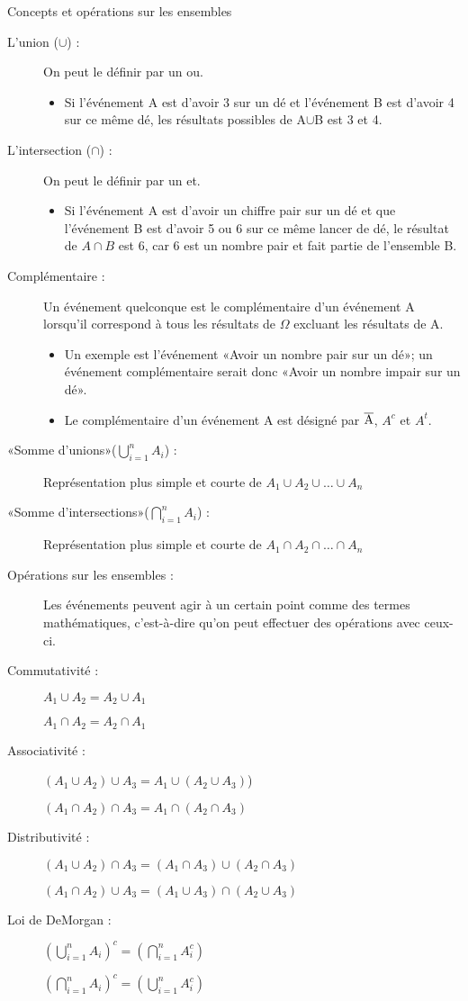 \documentclass[10pt, french]{article}
\begin{document}
\begin{multicols*}{2}
\begin{probch2}{Concepts et opérations sur les ensembles}
\begin{description}
  \item[L'union ({$\cup$}) :] On peut le définir par un ou. 
  	\begin{itemize}
  	\item	Si l'événement A est d'avoir 3 sur un dé et l'événement B est d'avoir 4 sur ce même dé, les résultats possibles de A{$\cup$}B est 3 et 4.
  	\end{itemize}
  \item[L'intersection ({$\cap$}) :] On peut le définir par un et. 
  	\begin{itemize}
  	\item	Si l'événement A est d'avoir un chiffre pair sur un dé et que l'événement B est d'avoir 5 ou 6 sur ce même lancer de dé, le résultat de $A \cap B$ est 6, car 6 est un nombre pair et fait partie de l'ensemble B. 
  	\end{itemize}
  \item[Complémentaire :] Un événement quelconque est le complémentaire d'un événement A lorsqu'il correspond à tous les résultats de $\Omega$ excluant les résultats de A. 
  	\begin{itemize}
  	\item	Un exemple est l'événement «Avoir un nombre pair sur un dé»; un événement complémentaire serait donc «Avoir un nombre impair sur un dé». 
  	\item	Le complémentaire d'un événement A est désigné par {$\overline{\rm A}$}, $A^{c}$ et $A^{t}$.
  	\end{itemize}
  \item[«Somme d'unions»($\bigcup_{i=1}^{n} A_i$) :] Représentation plus simple et courte de $A_1 \cup A_2 \cup \dots \cup A_n$
  \item[«Somme d'intersections»($\bigcap_{i=1}^{n} A_i$) :] Représentation plus simple et courte de $A_1 \cap A_2 \cap \dots \cap A_n$
  \item[Opérations sur les ensembles :] Les événements peuvent agir à un certain point comme des termes mathématiques, c'est-à-dire qu'on peut effectuer des opérations avec ceux-ci.
  \item[Commutativité :] $A_1	\cup	A_2	=	A_2 \cup A_1$
  \item[] $A_1	\cap	A_2	=	A_2 \cap A_1$
  \item[Associativité :] $(A_1 \cup A_2)	\cup A_3	=	A_1 \cup		(A_2 \cup A_3)$)
  \item[] $(A_1 \cap A_2)	\cap A_3	=	A_1 \cap		(A_2 \cap A_3)$
  \item[Distributivité :] $(A_1 \cup A_2)	\cap A_3 = (A_1 \cap A_3) \cup (A_2 \cap A_3)$
  \item[] $(A_1 \cap A_2)	\cup A_3 = (A_1 \cup A_3) \cap (A_2 \cup A_3)$
  \item[Loi de DeMorgan :] $(\bigcup_{i = 1}^{n} A_{i})^{c} = (\bigcap_{i=1}^{n} A_i^{c})$
  \item[] $(\bigcap_{i = 1}^{n} A_{i})^{c} = (\bigcup_{i=1}^{n} A_i^{c})$
\end{description}
\end{probch2}


\end{multicols*}
\end{document}
